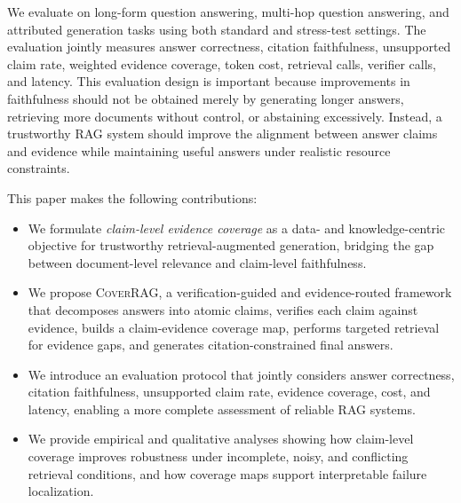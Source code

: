We evaluate \ragname on long-form question answering, multi-hop question answering, and attributed generation tasks using both standard and stress-test settings. The evaluation jointly measures answer correctness, citation faithfulness, unsupported claim rate, weighted evidence coverage, token cost, retrieval calls, verifier calls, and latency. This evaluation design is important because improvements in faithfulness should not be obtained merely by generating longer answers, retrieving more documents without control, or abstaining excessively. Instead, a trustworthy RAG system should improve the alignment between answer claims and evidence while maintaining useful answers under realistic resource constraints.

This paper makes the following contributions:

\begin{itemize}
    \item We formulate \emph{claim-level evidence coverage} as a data- and knowledge-centric objective for trustworthy retrieval-augmented generation, bridging the gap between document-level relevance and claim-level faithfulness.
    \item We propose \textsc{CoverRAG}, a verification-guided and evidence-routed framework that decomposes answers into atomic claims, verifies each claim against evidence, builds a claim-evidence coverage map, performs targeted retrieval for evidence gaps, and generates citation-constrained final answers.
    \item We introduce an evaluation protocol that jointly considers answer correctness, citation faithfulness, unsupported claim rate, evidence coverage, cost, and latency, enabling a more complete assessment of reliable RAG systems.
    \item We provide empirical and qualitative analyses showing how claim-level coverage improves robustness under incomplete, noisy, and conflicting retrieval conditions, and how coverage maps support interpretable failure localization.
\end{itemize}

